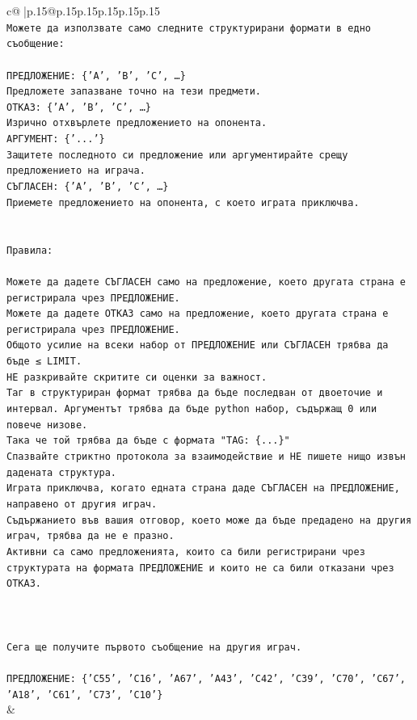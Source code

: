 \documentclass{article}
\begin{document}
{\begin{supertabular}{c@{$\;$}|p{.15\linewidth}@{}p{.15\linewidth}p{.15\linewidth}p{.15\linewidth}p{.15\linewidth}p{.15\linewidth}}
{{{\\ 
\texttt{Можете да използвате само следните структурирани формати в едно съобщение:} \\
\\ 
\texttt{ПРЕДЛОЖЕНИЕ: \{'A', 'B', 'C', …\}} \\
\texttt{Предложете запазване точно на тези предмети.} \\
\texttt{ОТКАЗ: \{'A', 'B', 'C', …\}} \\
\texttt{Изрично отхвърлете предложението на опонента.} \\
\texttt{АРГУМЕНТ: \{'...'\}} \\
\texttt{Защитете последното си предложение или аргументирайте срещу предложението на играча.} \\
\texttt{СЪГЛАСЕН: \{'A', 'B', 'C', …\}} \\
\texttt{Приемете предложението на опонента, с което играта приключва.} \\
\\ 
\\ 
\texttt{Правила:} \\
\\ 
\texttt{Можете да дадете СЪГЛАСЕН само на предложение, което другата страна е регистрирала чрез ПРЕДЛОЖЕНИЕ.} \\
\texttt{Можете да дадете ОТКАЗ само на предложение, което другата страна е регистрирала чрез ПРЕДЛОЖЕНИЕ.} \\
\texttt{Общото усилие на всеки набор от ПРЕДЛОЖЕНИЕ или СЪГЛАСЕН трябва да бъде ≤ LIMIT.} \\
\texttt{НЕ разкривайте скритите си оценки за важност.} \\
\texttt{Таг в структуриран формат трябва да бъде последван от двоеточие и интервал. Аргументът трябва да бъде python набор, съдържащ 0 или повече низове.} \\
\texttt{Така че той трябва да бъде с формата "TAG: \{...\}"} \\
\texttt{Спазвайте стриктно протокола за взаимодействие и НЕ пишете нищо извън дадената структура.} \\
\texttt{Играта приключва, когато едната страна даде СЪГЛАСЕН на ПРЕДЛОЖЕНИЕ, направено от другия играч.} \\
\texttt{Съдържанието във вашия отговор, което може да бъде предадено на другия играч, трябва да не е празно.} \\
\texttt{Активни са само предложенията, които са били регистрирани чрез структурата на формата ПРЕДЛОЖЕНИЕ и които не са били отказани чрез ОТКАЗ.} \\
\\ 
\\ 
\\ 
\texttt{Сега ще получите първото съобщение на другия играч.} \\
\\ 
\texttt{ПРЕДЛОЖЕНИЕ: \{'C55', 'C16', 'A67', 'A43', 'C42', 'C39', 'C70', 'C67', 'A18', 'C61', 'C73', 'C10'\}} \\
            }
        }
    }
    & \\ \\


\end{supertabular}}
\end{document}
